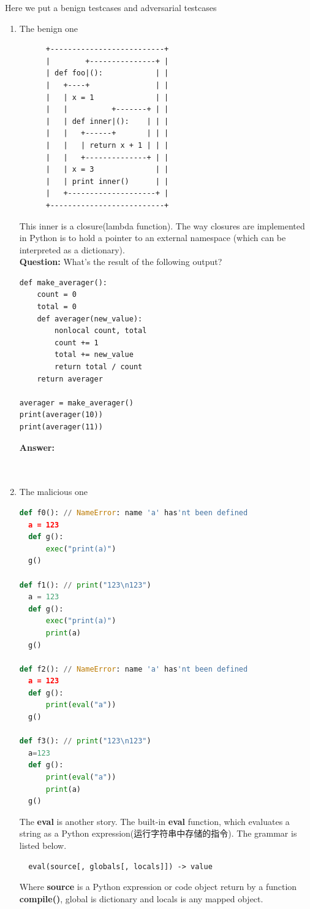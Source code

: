 \documentclass[a4paper]{exam}
\theoremstyle{definition}
\begin{document}
Here we put a benign testcases and adversarial testcases
\begin{enumerate}
  \item  The benign one
        \begin{lstlisting}
      +--------------------------+
      |        +---------------+ |
      | def foo|():            | |
      |   +----+               | |
      |   | x = 1              | |
      |   |          +-------+ | |
      |   | def inner|():    | | |
      |   |   +------+       | | |
      |   |   | return x + 1 | | |
      |   |   +--------------+ | |
      |   | x = 3              | |
      |   | print inner()      | |
      |   +--------------------+ |
      +--------------------------+
    \end{lstlisting}

        This inner is a closure(lambda function). The way closures are implemented in Python is to hold a pointer to an external namespace (which can be interpreted as a dictionary).
        \\
        \textbf{Question:} What's the result of the following output?
        \begin{lstlisting}
def make_averager():
    count = 0
    total = 0
    def averager(new_value):
        nonlocal count, total
        count += 1
        total += new_value
        return total / count
    return averager

averager = make_averager()
print(averager(10))
print(averager(11))
\end{lstlisting}
        \textbf{Answer:}
        \\
        \\
        \\
  \item The malicious one
        \begin{lstlisting}[language=Python]
def f0(): // NameError: name 'a' has'nt been defined
  a = 123
  def g():
      exec("print(a)")
  g()

def f1(): // print("123\n123")
  a = 123
  def g():
      exec("print(a)")
      print(a)
  g()

def f2(): // NameError: name 'a' has'nt been defined
  a = 123
  def g():
      print(eval("a"))
  g()

def f3(): // print("123\n123")
  a=123
  def g():
      print(eval("a"))
      print(a)
  g()
  \end{lstlisting}
        The \textbf{eval} is another story. The built-in \textbf{eval} function, which evaluates a string as a Python expression(运行字符串中存储的指令). The grammar is listed below.
        \begin{lstlisting}
  eval(source[, globals[, locals]]) -> value
\end{lstlisting}
        Where \textbf{source} is a Python expression or code object return by a function \textbf{compile()}, global is dictionary and locals is any mapped object.

\end{enumerate}
\end{document}
